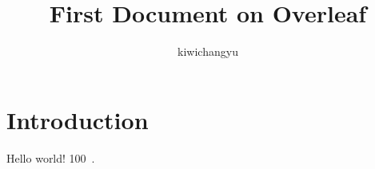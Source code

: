 \documentclass[12pt]{article}
\author{kiwichangyu}
\title{First Document on Overleaf}
\begin{document}
\maketitle


\section{Introduction}
Hello world!
\SI{100}{\kilo\meter.}


\end{document}
